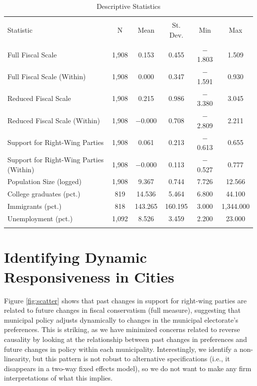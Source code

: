 \documentclass[a4paper,12pt]{article}
\begin{document}
\begin{table}[!htbp] \centering 
	\caption{Descriptive Statistics} 
	\label{tab:desc} 
		\begin{tabular}{@{\extracolsep{5pt}}lccccc} 
			\\[-1.8ex]\hline 
			\hline \\[-1.8ex] 
			Statistic & \multicolumn{1}{c}{N} & \multicolumn{1}{c}{Mean} & \multicolumn{1}{c}{St. Dev.} & \multicolumn{1}{c}{Min} & \multicolumn{1}{c}{Max} \\ 
			\hline \\[-1.8ex] 
			Full Fiscal Scale & 1,908 & 0.153 & 0.455 & $-$1.803 & 1.509 \\ 
			Full Fiscal Scale (Within) & 1,908 & 0.000 & 0.347 & $-$1.591 & 0.930 \\ 
			Reduced Fiscal Scale & 1,908 & 0.215 & 0.986 & $-$3.380 & 3.045 \\ 
			Reduced Fiscal Scale (Within) & 1,908 & $-$0.000 & 0.708 & $-$2.809 & 2.211 \\ 
			Support for Right-Wing Parties & 1,908 & 0.061 & 0.213 & $-$0.613 & 0.655 \\ 
			Support for Right-Wing Parties (Within) & 1,908 & $-$0.000 & 0.113 & $-$0.527 & 0.777 \\ 
			Population Size (logged) & 1,908 & 9.367 & 0.744 & 7.726 & 12.566 \\ 
			College graduates (pct.) & 819 & 14.536 & 5.464 & 6.800 & 44.100 \\ 
			Immigrants (pct.) & 818 & 143.265 & 160.195 & 3.000 & 1,344.000 \\ 
			Unemployment (pct.)& 1,092 & 8.526 & 3.459 & 2.200 & 23.000 \\ 
			\hline \\[-1.8ex] 
		\end{tabular} 
\end{table} 



\section*{Identifying Dynamic Responsiveness in Cities}


Figure \ref{fig:scatter} shows that past changes in support for right-wing parties are related to future changes in fiscal conservatism (full measure), suggesting that municipal policy adjusts dynamically to changes in the municipal electorate's preferences. This is striking, as we have minimized concerns related to reverse causality by looking at the relationship between past changes in preferences and future changes in policy within each municipality. Interestingly, we identify a non-linearity, but this pattern is not robust to alternative specifications (i.e., it disappears in a two-way fixed effects model), so we do not want to make any firm interpretations of what this implies.
\end{document}
